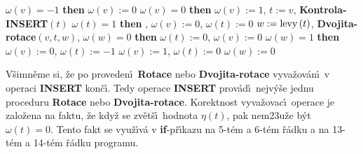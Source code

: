 \phantom{---}{\bf if} $\omega \left(v\right)=-1$ {\bf then}\newline 
\phantom{------}$\omega \left(v\right):=0$\newline 
\phantom{---}{\bf else}\newline 
\phantom{------}{\bf if} $\omega \left(v\right)=0$ {\bf then}\newline 
\phantom{---------}$\omega \left(v\right):=1$, $t:=v$, {\bf Kontrola-INSERT}$\left(t\right)$\newline 
\phantom{------}{\bf else}\newline 
\phantom{---------}{\bf if} $\omega \left(t\right)=1$ {\bf then}\newline 
\phantom{------------}{\bf Rotace$\left(v,t\right)$}, $\omega \left(v\right):=0$, $\omega \left(t\right):=0$\newline 
\phantom{---------}{\bf else}\newline 
\phantom{------------}$w:=\operatorname{levy}\left(t\right)$, {\bf Dvojita-rotace$\left(v,t,w\right)$},\newline 
\phantom{------------}{\bf if} $\omega \left(w\right)=0$ {\bf then}\newline 
\phantom{---------------}$\omega \left(t\right):=0$, $\omega \left(v\right):=0$\newline 
\phantom{------------}{\bf else}\newline 
\phantom{---------------}{\bf if} $\omega \left(w\right)=1$ {\bf then}\newline 
\phantom{------------------}$\omega \left(v\right):=0$, $\omega\left(t\right):=-1$\newline 
\phantom{---------------}{\bf else}\newline 
\phantom{------------------}$\omega \left(v\right):=1$, $\omega \left(t\right):=0$\newline 
\phantom{---------------}{\bf endif}\newline 
\phantom{------------}{\bf endif}\newline 
\phantom{------------}$\omega \left(w\right):=0$\newline 
\phantom{---------}{\bf endif}\newline 
\phantom{------}{\bf endif}\newline 
\phantom{---}{\bf endif\newline 
endif}
\bigskip

\flushpar V\v simn\v eme si, \v ze po proveden\'\i\ {\bf Rotace} nebo
{\bf Dvojita-rotace} vyva\v zov\'an\'\i\ v operaci {\bf INSERT} kon\v c\'\i . Tedy 
operace {\bf INSERT} prov\'ad\'\i\ nejv\'y\v se jednu proceduru {\bf Rotace }
nebo {\bf Dvojita-rota\-ce}. Korektnost vyva\v zovac\'\i\ operace je 
zalo\v zena na faktu, \v ze kdy\v z se zv\v et\v s\'\i\ hodnota $
\eta \left(t\right)$, pak 
nem\accent23u\v ze b\'yt $\omega \left(t\right)=0$. Tento fakt se vyu\v z\'\i v\'a  v 
{\bf if}-p\v r\'\i kazu na 5-t\'em a 6-t\'em \v r\'adku a na 13-t\'em a 14-t\'em  
\v r\'adku programu.
\medskip

